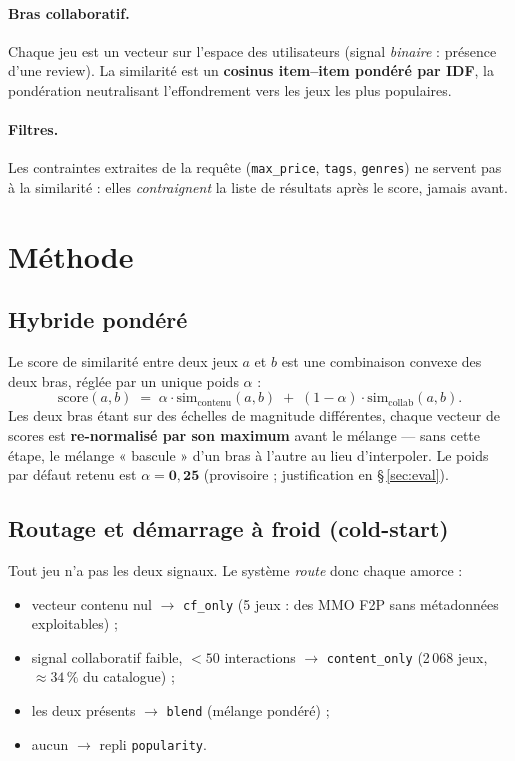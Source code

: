 \documentclass[11pt,a4paper]{article}
\begin{document}
\paragraph{Bras collaboratif.} Chaque jeu est un vecteur sur l'espace des
utilisateurs (signal \emph{binaire} : présence d'une review). La similarité est
un \textbf{cosinus item--item pondéré par IDF}, la pondération neutralisant
l'effondrement vers les jeux les plus populaires.

\paragraph{Filtres.} Les contraintes extraites de la requête (\texttt{max\_price},
\texttt{tags}, \texttt{genres}) ne servent pas à la similarité : elles
\emph{contraignent} la liste de résultats après le score, jamais avant.

\section{Méthode}

\subsection{Hybride pondéré}

Le score de similarité entre deux jeux $a$ et $b$ est une combinaison convexe
des deux bras, réglée par un unique poids $\alpha$ :
\[
  \mathrm{score}(a,b) \;=\; \alpha \cdot \mathrm{sim}_{\text{contenu}}(a,b)
  \;+\; (1-\alpha)\cdot \mathrm{sim}_{\text{collab}}(a,b).
\]
Les deux bras étant sur des échelles de magnitude différentes, chaque vecteur de
scores est \textbf{re-normalisé par son maximum} avant le mélange — sans cette
étape, le mélange « bascule » d'un bras à l'autre au lieu d'interpoler. Le poids
par défaut retenu est $\alpha = \mathbf{0{,}25}$ (provisoire ; justification en
§\,\ref{sec:eval}).

\subsection{Routage et démarrage à froid (cold-start)}

Tout jeu n'a pas les deux signaux. Le système \emph{route} donc chaque amorce :
\begin{itemize}
  \item vecteur contenu nul $\rightarrow$ \texttt{cf\_only} (5 jeux : des MMO F2P
        sans métadonnées exploitables) ;
  \item signal collaboratif faible, $< 50$ interactions $\rightarrow$
        \texttt{content\_only} (2\,068 jeux, $\approx 34\,\%$ du catalogue) ;
  \item les deux présents $\rightarrow$ \texttt{blend} (mélange pondéré) ;
  \item aucun $\rightarrow$ repli \texttt{popularity}.
\end{itemize}
\end{document}
